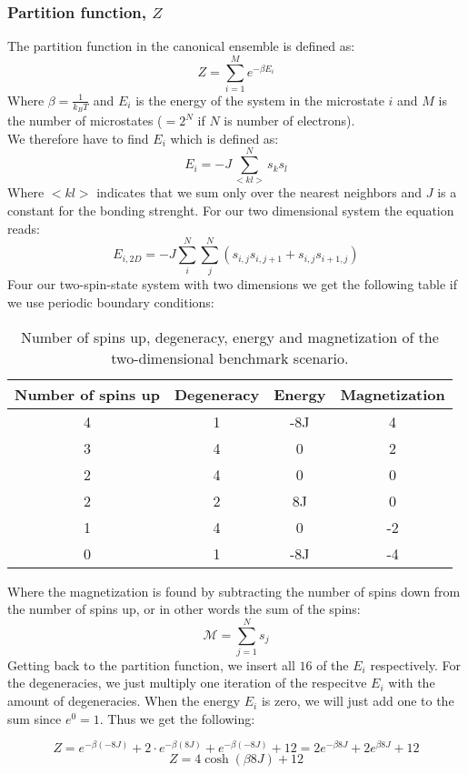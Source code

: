 \documentclass[../main.tex]{subfiles}
\begin{document}
\subsubsection*{Partition function, $Z$}
The partition function in the canonical ensemble is defined as:
\[ Z = \sum_{i=1}^M e^{-\beta E_i}\]
Where $\beta =\frac{1}{k_B T}$ and $E_i$ is the energy of the system in the microstate $i$ and $M$ is the number of microstates ($=2^N$ if $N$ is number of electrons).
\\
We therefore have to find $E_i$ which is defined as:
\[E_i = -J \sum_{<kl>}^N s_k s_l\]
Where $<kl>$ indicates that we sum only over the nearest neighbors and $J$ is a constant for the bonding strenght. For our two dimensional system the equation reads:
\[E_{i,2D} = -J \sum_i^N \sum_j^N \left(s_{i,j}s_{i,j+1} + s_{i,j}s_{i+1,j}\right)\]
Four our two-spin-state system with two dimensions we get the following table if we use periodic boundary conditions:
\begin{table}[!h]
  \begin{center}
    \begin{tabular}{| c | c | c | c |}
      \hline
      Number of spins up & Degeneracy & Energy & Magnetization\\
      \hline
      4 & 1 & -8J & 4\\
      3 & 4 & 0 & 2 \\
      2 & 4 & 0 & 0\\
      2 & 2 & 8J & 0 \\
      1 & 4 & 0 & -2 \\
      0 & 1 & -8J & -4 \\
      \hline
    \end{tabular}
    \caption{Number of spins up, degeneracy, energy and magnetization of the two-dimensional benchmark scenario.}
    \label{tab:2x2spinsEnergiesMags}
  \end{center}
\end{table}
\FloatBarrier
Where the magnetization is found by subtracting the number of spins down from the number of spins up, or in other words the sum of the spins:
\[\mathcal{M} = \sum_{j=1}^N s_j\]
Getting back to the partition function, we insert all $16$ of the $E_i$ respectively. For the degeneracies, we just multiply one iteration of the respecitve $E_i$ with the amount of degeneracies. When the energy $E_i$ is zero, we will just add one to the sum since $e^0 = 1$. Thus we get the following:

\[Z = e^{-\beta (-8J)} + 2 \cdot e^{-\beta (8J)} + e^{-\beta (-8J)} + 12 = 2e^{-\beta 8J} + 2e^{\beta 8J} + 12\]
\[Z = 4\cosh(\beta 8J) + 12\]
\end{document}
